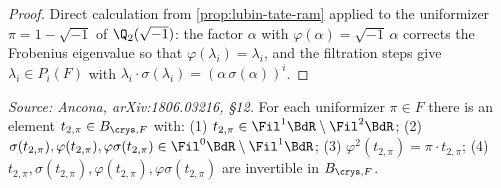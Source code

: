 \begin{proof}
  Direct calculation from \cref{prop:lubin-tate-ram} applied to the uniformizer
  \(\pi = 1 - \sqrt{-1}\) of \(\Q_2(\sqrt{-1})\): the factor \(\alpha\) with
  \(\varphi(\alpha) = \sqrt{-1}\,\alpha\) corrects the Frobenius eigenvalue so
  that \(\varphi(\lambda_i) = \lambda_i\), and the filtration steps give
  \(\lambda_i \in P_i(F)\) with \(\lambda_i \cdot \sigma(\lambda_i) = (\alpha\,
  \sigma(\alpha))^i\).
\end{proof}

\begin{proposition}
  \label{prop:idea-ref}
  \textit{Source: Ancona, arXiv:1806.03216, \S12.}
  For each uniformizer \(\pi \in F\) there is an element
  \(t_{2,\pi} \in B_{\crys,F}\) with:
  (1) \(t_{2,\pi} \in \Fil^1 \BdR \setminus \Fil^2 \BdR\);
  (2) \(\sigma(t_{2,\pi}), \varphi(t_{2,\pi}), \varphi\sigma(t_{2,\pi}) \in
  \Fil^0 \BdR \setminus \Fil^1 \BdR\);
  (3) \(\varphi^2(t_{2,\pi}) = \pi \cdot t_{2,\pi}\);
  (4) \(t_{2,\pi}, \sigma(t_{2,\pi}), \varphi(t_{2,\pi}), \varphi\sigma(t_{2,\pi})\)
  are invertible in \(B_{\crys,F}\).
\end{proposition}

